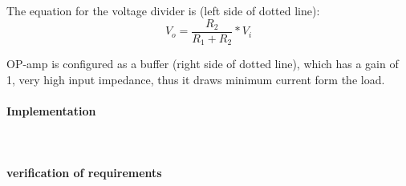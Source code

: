 The equation for the voltage divider is (left side of dotted line):
\begin{equation}
V_o=\frac{R_2}{R_1+R_2}*V_i
\end{equation}

OP-amp is configured as a buffer (right side of dotted line), which has a gain of 1, very high input impedance, thus it draws minimum current form the load. 
\paragraph{Implementation}\mbox{}\\


\paragraph{verification of requirements}\mbox{}\\


